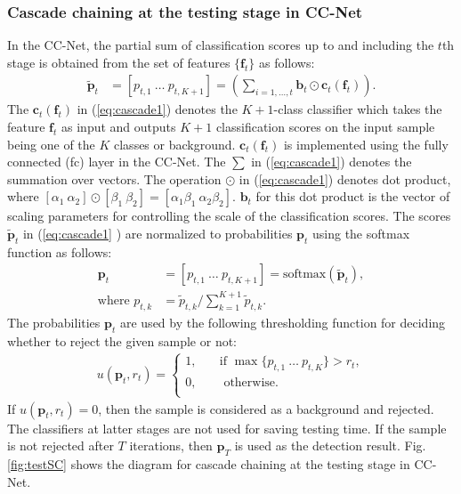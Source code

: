 \documentclass[10pt,twocolumn,letterpaper]{article}
\begin{document}
\subsubsection{Cascade chaining at the testing stage in CC-Net}
In the CC-Net, the partial sum of classification scores up to and including the $t$th stage is obtained from the set of features $\{\mathbf{f}_t\}$ as follows:
\begin{align}
\tilde{\mathbf{p}}_t &= [p_{t, 1}\  \ldots \ p_{t, K+1}] =  \left( \sum_{i=1, \ldots, t} \mathbf{b}_t \odot \mathbf{c}_t(\mathbf{f}_t) \right).  \label{eq:cascade1} 
\end{align}
The $\mathbf{c}_t(\mathbf{f}_t)$ in (\ref{eq:cascade1}) denotes the $K+1$-class classifier which takes the feature $\mathbf{f}_t$ as input and outputs $K+1$ classification scores on the input sample being one of the $K$ classes or background.  $\mathbf{c}_t(\mathbf{f}_t)$ is implemented using the fully connected (fc) layer in the CC-Net. The $\sum$ in (\ref{eq:cascade1}) denotes the summation over vectors. The operation $\odot$ in (\ref{eq:cascade1}) denotes dot product, where $[\alpha_1 \  \alpha_2]\odot [\beta_1 \ \beta_2] = [\alpha_1\beta_1 \ \alpha_2 \beta_2]$. $\mathbf{b}_t$ for this dot product is the vector of scaling parameters for controlling the scale of the classification scores. The scores $\tilde{\mathbf{p}}_t$ in (\ref{eq:cascade1} ) are normalized to probabilities $\mathbf{p}_t $ using the softmax function as follows:
\begin{align}
\mathbf{p}_t &=  [{p}_{t, 1}\  \ldots \ {p}_{t, K+1}] =\textrm{softmax} (\tilde{\mathbf{p}}_t), \label{eq:cascade2}  \\
\textrm{where } {p}_{t, k} &= {\tilde{p}_{t, k}}/{ \sum_{k=1}^{K+1}\tilde{p}_{t, k}}. \label{eq:cascade3}
\end{align}
The probabilities $\mathbf{p}_t$ are used by the following thresholding function for deciding whether to reject the given sample or not:
\begin{align}
u(\mathbf{p}_t, r_t) =
\begin{cases} 
1,& \quad \textrm{if }  \max\{ p_{t, 1}\  \ldots \ p_{t, K} \} > r_t, \\
0,& \quad \textrm{ otherwise.} \\
\end{cases}
  \label{eq:cascade4}
\end{align}
If $u(\mathbf{p}_t, r_t) =0$, then the sample is considered as a background and rejected. The classifiers at latter stages are not used for saving testing time. If the sample is not rejected after $T$ iterations, then $\mathbf{p}_T$ is used as the detection result. Fig. \ref{fig:testSC} shows the diagram for cascade chaining at the testing stage in  CC-Net. %
\end{document}
